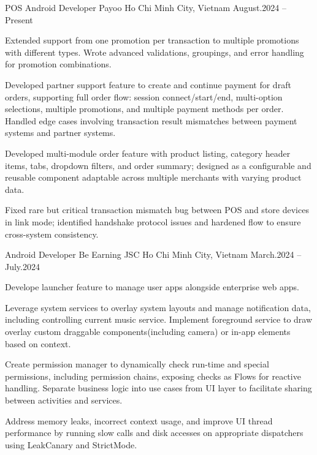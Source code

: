 \begin{cventries}

    \cventry
    {POS Android Developer}
    {Payoo}
    {Ho Chi Minh City, Vietnam}
    {August.2024 -- Present}
    {
        \begin{cvitems}
            \item {
                Extended support from one promotion per transaction to multiple promotions with different types.
                Wrote advanced validations, groupings, and error handling for promotion combinations.
            }
            \item {
                Developed partner support feature to create and continue payment for draft orders, supporting full order flow: session connect/start/end,
                multi-option selections, multiple promotions, and multiple payment methods per order. Handled edge cases involving transaction result
                mismatches between payment systems and partner systems.
            }
            \item {
                Developed multi-module order feature with product listing, category header items, tabs, dropdown filters, and order summary;
                designed as a configurable and reusable component adaptable across multiple merchants with varying product data.
            }
            \item {
                Fixed rare but critical transaction mismatch bug between POS and store devices in link mode;
                identified handshake protocol issues and hardened flow to ensure cross-system consistency.
            }
        \end{cvitems}
    }

    \cventry
    {Android Developer}
    {Be Earning JSC}
    {Ho Chi Minh City, Vietnam}
    {March.2024 -- July.2024}
    {
        \begin{cvitems}
            \item {
                Develope launcher feature to manage user apps alongside enterprise web apps.
            }
            \item {
                Leverage system services to overlay system layouts and manage notification data, including controlling current music service.
                Implement foreground service to draw overlay custom draggable components(including camera) or in-app elements based on context.
            }
            \item {
                Create permission manager to dynamically check run-time and special permissions, including permission chains, exposing checks as Flows for reactive handling.
                Separate business logic into use cases from UI layer to facilitate sharing between activities and services.
            }
            \item {
                Address memory leaks, incorrect context usage, and improve UI thread performance by running slow calls and disk accesses on appropriate dispatchers using LeakCanary and StrictMode.
            }
        \end{cvitems}
    }


\end{cventries}
